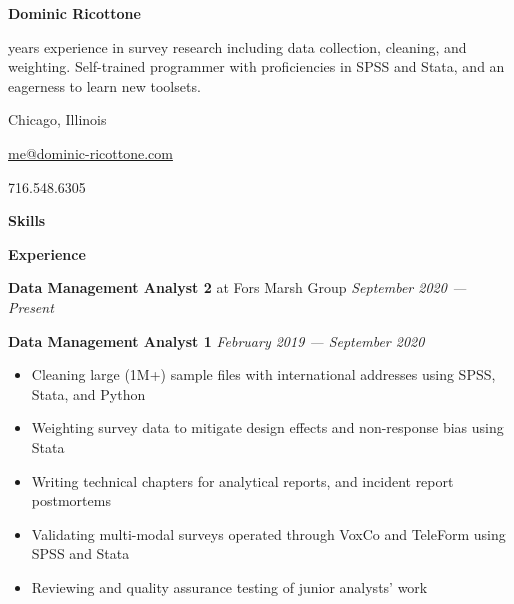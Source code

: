 \documentclass[12pt]{article}
\begin{document}
\begin{vwcol}[widths={0.65,0.35},justify=flush,rule=0pt]
\Huge
\noindent \textbf{Dominic Ricottone}
\normalsize

\vspace{.5em}
 years experience in survey research including data collection, cleaning, and weighting.
Self-trained programmer with proficiencies in SPSS and Stata, and an eagerness to learn new toolsets.

\noindent {} Chicago, Illinois

\vspace{.5em}
\noindent {} \href{mailto:me@dominic-ricottone.com}{me@dominic-ricottone.com}

\vspace{.5em}
\noindent {} 716.548.6305
\end{vwcol}

\vspace{.5em}
\large
\noindent \textbf{Skills} \hrulefill
\normalsize

\vspace{.5em}
{}

{}
\tcbox{\strut \LaTeX}
\vspace{1em}

\large
\noindent \textbf{Experience} \hrulefill
\normalsize
\vspace{.5em}

\noindent \textbf{Data Management Analyst 2} at Fors Marsh Group \hfill \textit{September 2020 --- Present}
\vspace{.5em}

\noindent \textbf{Data Management Analyst 1} \hfill \textit{February 2019 --- September 2020}
\begin{itemize}[]
\item Cleaning large (1M+) sample files with international addresses using SPSS, Stata, and Python
\item Weighting survey data to mitigate design effects and non-response bias using Stata
\item Writing technical chapters for analytical reports, and incident report postmortems
\item Validating multi-modal surveys operated through VoxCo and TeleForm using SPSS and Stata
\item Reviewing and quality assurance testing of junior analysts' work
\end{itemize}
\end{document}
